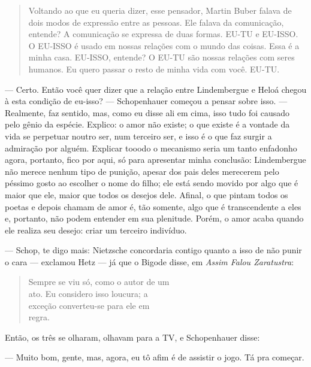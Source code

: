 \begin{quotation}
Voltando ao que eu queria dizer, esse pensador, Martin Buber falava de dois modos de expressão entre as pessoas. Ele falava da comunicação, entende? A comunicação se expressa de duas formas. EU-TU e EU-ISSO. O EU-ISSO é usado em nossas relações com o mundo das coisas. Essa é a minha casa. EU-ISSO, entende? O EU-TU são nossas relações com seres humanos. Eu quero passar o resto de minha vida com você. EU-TU.
\end{quotation}

--- Certo. Então você quer dizer que a relação entre Lindembergue e Heloá chegou à esta condição de eu-isso? --- Schopenhauer começou a pensar sobre isso. --- Realmente, faz sentido, mas, como eu disse ali em cima, isso tudo foi causado pelo gênio da espécie. Explico: o amor não existe; o que existe é a vontade da vida se perpetuar noutro ser, num terceiro ser, e isso é o que faz surgir a admiração por alguém. Explicar tooodo o mecanismo seria um tanto enfadonho agora, portanto, fico por aqui, só para apresentar minha conclusão: Lindembergue não merece nenhum tipo de punição, apesar dos pais deles merecerem pelo péssimo gosto ao escolher o nome do filho; ele está sendo movido por algo que é maior que ele, maior que todos os desejos dele. Afinal, o que pintam todos os poetas e depois chamam de amor é, tão somente, algo que é transcendente a eles e, portanto, não podem entender em sua plenitude. Porém, o amor acaba quando ele realiza seu desejo: criar um terceiro indivíduo.

--- Schop, te digo mais: Nietzsche concordaria contigo quanto a isso de não punir o cara --- exclamou Hetz --- já que o Bigode disse, em \emph{Assim Falou Zaratustra}:

\begin{quotation}
\noindent Sempre se viu só, como o autor de um\\
ato. Eu considero isso loucura; a\\
exceção converteu-se para ele em\\
regra.\\
\end{quotation}

Então, os três se olharam, olhavam para a TV, e Schopenhauer disse:

--- Muito bom, gente, mas, agora, eu tô afim é de assistir o jogo. Tá pra começar.
